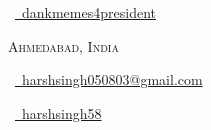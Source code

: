 \documentclass[a4paper,10pt]{extarticle} %
\begin{document}
\pagestyle{empty} %


\begin{multicols}{3}
\normalsize \faGithub\ {\href{https://github.com/dankmemes4president}{\  dankmemes4president}}\\
\columnbreak
\normalsize\par{\centering{\huge\textsc{\textcolor{primary}{Harsh Singh}}}\par} %
\par{\centering\normalsize {\textsc{Ahmedabad, India}}\hfill\par}
\columnbreak
\raggedright\hfill\normalsize \faEnvelope\ {\href{mailto:harshsingh050803@gmail.com}{\  harshsingh050803@gmail.com}}\\
\raggedright\hfill\normalsize \faLinkedinSquare\ {\href{https://www.linkedin.com/in/harshsingh58}{\  harshsingh58}}\\
\end{multicols}

\end{document}
